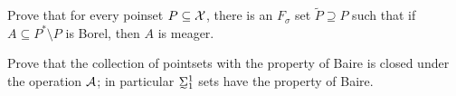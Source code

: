 \begin{exercise}
    Prove that for every poinset $P \subseteq \mathcal{X}$, there is an $F_{\sigma}$ set $\tilde{P} \supseteq P$ such that if $A \subseteq P^*\setminus P$ is Borel, then $A$ is meager. 
\end{exercise}

\begin{exercise}
    Prove that the collection of pointsets with the property of Baire is closed under the operation $\mathcal{A}$; in particular $\undertilde{\Sigma}_1^1$ sets have the property of Baire. 
\end{exercise}